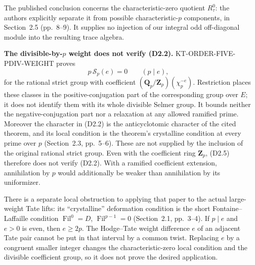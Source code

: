 \documentclass[11pt,a4paper]{article}
\theoremstyle{definition}
\renewcommand{\paragraph}[1]{\par\smallskip\noindent\textbf{#1}\quad\ignorespaces}
\begin{document}
The published conclusion concerns the characteristic-zero
quotient $R_\tau^0$: the authors explicitly separate it from
possible characteristic-$p$ components, in Section~2.5
(pp.~8--9).  It supplies no injection of our integral odd
off-diagonal module into the resulting trace algebra.

\paragraph{The divisible-by-$p$ weight does not verify (D2.2).}
KT-ORDER-FIVE-PDIV-WEIGHT proves
\[
 p\,\mathcal S_p(e)=0\qquad(p\mid e),                         \tag{D2.5}
\]
for the rational strict group with coefficient
$(\mathbf Q_p/\mathbf Z_p)(\chi_p^{-e})$.
Restriction places these classes in the positive-conjugation
part of the corresponding group over $E$; it does not identify
them with its whole divisible Selmer group.  It bounds neither
the negative-conjugation part nor a relaxation at any allowed
ramified prime.  Moreover the character in (D2.2) is the
anticyclotomic character of the cited theorem, and its local
condition is the theorem's crystalline condition at every
prime over $p$ (Section~2.3, pp.~5--6).  These are not supplied
by the inclusion of the original rational strict group.
Even with the coefficient ring $\mathbf Z_p$, (D2.5) therefore
does not verify (D2.2).  With a ramified coefficient extension,
annihilation by $p$ would additionally be weaker than
annihilation by its uniformizer.

There is a separate local obstruction to applying that paper to
the actual large-weight Tate lifts: its ``crystalline'' deformation
condition is the short Fontaine--Laffaille condition
$\operatorname{Fil}^0=D$, $\operatorname{Fil}^{p-1}=0$
(Section~2.1, pp.~3--4).  If $p\mid e$ and $e>0$ is even, then
$e\geq2p$.  The Hodge--Tate weight difference $e$ of an adjacent
Tate pair cannot be put in that interval by a common twist.
Replacing $e$ by a congruent smaller integer changes the
characteristic-zero local condition and the divisible
coefficient group, so it does not prove the desired application.
\end{document}
